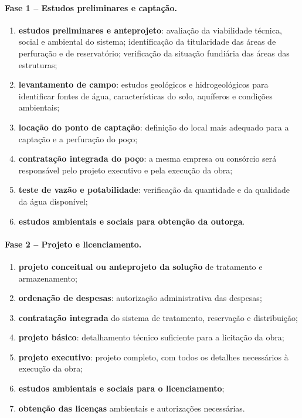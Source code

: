 \paragraph{Fase 1 -- Estudos preliminares e captação.}
\begin{enumerate}[label=\alph*)]
  \item \textbf{estudos preliminares e anteprojeto}: avaliação da viabilidade
        técnica, social e ambiental do sistema; identificação da titularidade
        das áreas de perfuração e de reservatório; verificação da situação
        fundiária das áreas das estruturas;
  \item \textbf{levantamento de campo}: estudos geológicos e
        hidrogeológicos para identificar fontes de água, características do
        solo, aquíferos e condições ambientais;
  \item \textbf{locação do ponto de captação}: definição do local mais
        adequado para a captação e a perfuração do poço;
  \item \textbf{contratação integrada do poço}: a mesma empresa ou consórcio
        será responsável pelo projeto executivo e pela execução da obra;
  \item \textbf{teste de vazão e potabilidade}: verificação da quantidade e
        da qualidade da água disponível;
  \item \textbf{estudos ambientais e sociais para obtenção da outorga}.
\end{enumerate}

\paragraph{Fase 2 -- Projeto e licenciamento.}
\begin{enumerate}[label=\alph*), resume]
  \item \textbf{projeto conceitual ou anteprojeto da solução} de tratamento
        e armazenamento;
  \item \textbf{ordenação de despesas}: autorização administrativa das
        despesas;
  \item \textbf{contratação integrada} do sistema de tratamento,
        reservação e distribuição;
  \item \textbf{projeto básico}: detalhamento técnico suficiente para a
        licitação da obra;
  \item \textbf{projeto executivo}: projeto completo, com todos os detalhes
        necessários à execução da obra;
  \item \textbf{estudos ambientais e sociais para o licenciamento};
  \item \textbf{obtenção das licenças} ambientais e autorizações necessárias.
\end{enumerate}


